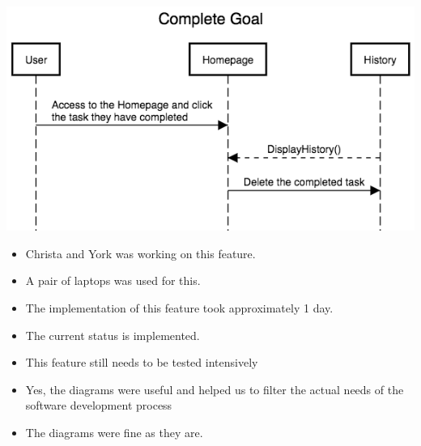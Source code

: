 \documentclass[a4paper]{article}
\begin{document}
\includegraphics[width=\textwidth]{complete_goal.png} 
\newline
\newline
\newline
\begin{itemize}
	\item Christa and York was working on this feature. 
	\item A pair of laptops was used for this.
    \item The implementation of this feature took approximately 1 day.
    \item The current status is implemented.
  \item This feature still needs to be tested intensively 
  \item Yes, the diagrams were useful and helped us to filter the actual needs of the software development process
  \item The diagrams were fine as they are.
\end{itemize}
\end{document}
